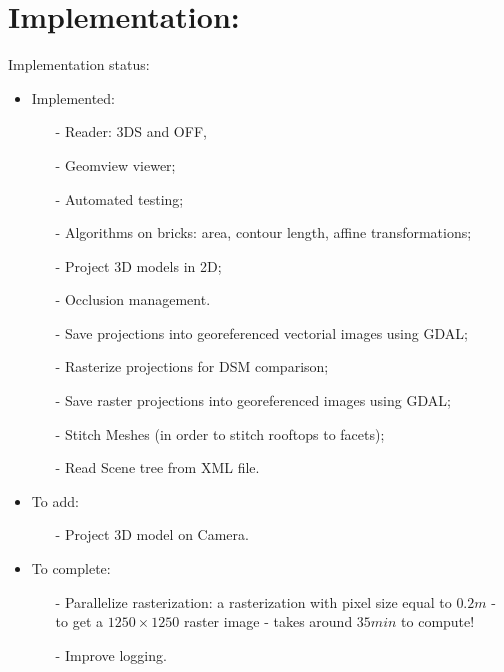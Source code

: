 \documentclass[a4paper, 11pt]{article}
\begin{document}
	\section*{Implementation:}
	Implementation status:
	\begin{itemize}
		\item Implemented:
			\begin{itemize}
				\item[-] Reader: 3DS and OFF,
				\item[-] Geomview viewer;
				\item[-] Automated testing;
				\item[-] Algorithms on bricks: area, contour length, affine transformations;
				\item[-] Project 3D models in 2D;
				\item[-] Occlusion management.
				\item[-] Save projections into georeferenced vectorial images using GDAL;
				\item[-] Rasterize projections for DSM comparison;
				\item[-] Save raster projections into georeferenced images using GDAL;
				\item[-] Stitch Meshes (in order to stitch rooftops to facets);
				\item[-] Read Scene tree from XML file.
			\end{itemize}
		\item To add:
			\begin{itemize}
				\item[-] Project 3D model on Camera.
		\end{itemize}
		\item To complete:
			\begin{itemize}
				\item[-] Parallelize rasterization: a rasterization with pixel size equal to $0.2 m$ - to get a $1250 \times 1250$ raster image - takes around $35 min$ to compute!
				\item[-] Improve logging.
			\end{itemize}
	\end{itemize}
	
\end{document}
